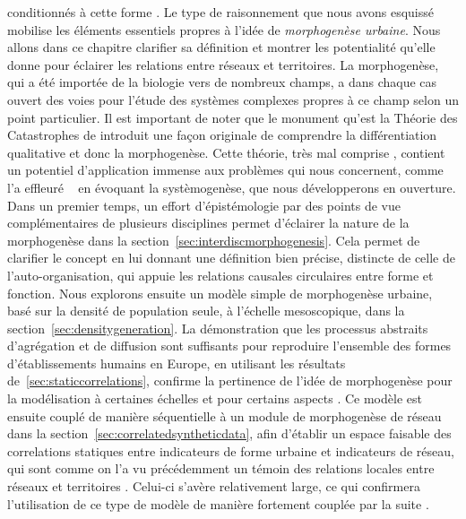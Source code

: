 conditionnés à cette forme . Le type de raisonnement que nous avons esquissé mobilise les éléments essentiels propres à l'idée de \emph{morphogenèse urbaine}. Nous allons dans ce chapitre clarifier sa définition et montrer les potentialité qu'elle donne pour éclairer les relations entre réseaux et territoires. La morphogenèse, qui a été importée de la biologie vers de nombreux champs, a dans chaque cas ouvert des voies pour l'étude des systèmes complexes propres à ce champ selon un point particulier. Il est important de noter que le monument qu'est la Théorie des Catastrophes de  introduit une façon originale de comprendre la différentiation qualitative et donc la morphogenèse. Cette théorie, très mal comprise , contient un potentiel d'application immense aux problèmes qui nous concernent, comme l'a effleuré  ~\cite{durand2003geographes} en évoquant la systèmogenèse, que nous développerons en ouverture. Dans un premier temps, un effort d'épistémologie par des points de vue complémentaires de plusieurs disciplines permet d'éclairer la nature de la morphogenèse dans la section~\ref{sec:interdiscmorphogenesis}. Cela permet de clarifier le concept en lui donnant une définition bien précise, distincte de celle de l'auto-organisation, qui appuie les relations causales circulaires entre forme et fonction. Nous explorons ensuite un modèle simple de morphogenèse urbaine, basé sur la densité de population seule, à l'échelle mesoscopique, dans la section~\ref{sec:densitygeneration}. La démonstration que les processus abstraits d'agrégation et de diffusion sont suffisants pour reproduire l'ensemble des formes d'établissements humains en Europe, en utilisant les résultats de~\ref{sec:staticcorrelations}, confirme la pertinence de l'idée de morphogenèse pour la modélisation à certaines échelles et pour certains aspects . Ce modèle est ensuite couplé de manière séquentielle à un module de morphogenèse de réseau dans la section~\ref{sec:correlatedsyntheticdata}, afin d'établir un espace faisable  des correlations statiques entre indicateurs de forme urbaine et indicateurs de réseau, qui sont comme on l'a vu précédemment un témoin des relations locales entre réseaux et territoires . Celui-ci s'avère relativement large, ce qui confirmera l'utilisation de ce type de modèle de manière fortement couplée par la suite .




